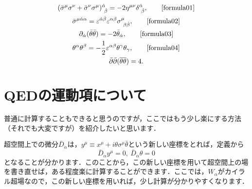 \documentclass[a4paper,uplatex,dvipdfmx]{jsarticle}
\theoremstyle{definition}
\begin{document}
\begin{gather}
  (
    \bar{\sigma}^{\mu}\sigma^{\nu}
    +
    \bar{\sigma}^{\nu}\sigma^{\mu}
  )^{\dot{\alpha}}_{\ \dot{\beta}}
  =
  -2\eta^{\mu\nu}\delta^{\dot{\alpha}}_{\ \dot{\beta}}
  ,
  \tag*{\eqref{formula01}}
  \\
  \bar{\sigma}^{\mu\dot{\alpha}\alpha}
  =
  \varepsilon^{\dot{\alpha}\dot{\beta}}\varepsilon^{\alpha\beta}
  \sigma^{\mu}_{\ \beta\dot{\beta}}
  ,
  \tag*{\eqref{formula02}}
  \\
  \partial_{\dot{\alpha}}(\bar{\theta}\bar{\theta})
  =
  -2\bar{\theta}_{\dot{\alpha}}   
  ,
  \tag*{\eqref{formula03}}
  \\
  \theta^{\alpha}\theta^{\beta}
  =
  -
  \frac{1}{2}\varepsilon^{\alpha\beta}\theta^{\gamma}\theta_{\gamma}
  ,
  \tag*{\eqref{formula04}}
  \\
  \bar{\partial}\bar{\partial}(\overline{\theta\theta})
  =
  4
  .
\end{gather}


\section{QEDの運動項について}
\label{kin_term_QED}

普通に計算することもできると思うのですが，ここではもう少し楽にする方法（それでも大変ですが）を紹介したいと思います．

超空間上での微分$\bar{D}_{\dot{\alpha}}$は，$y^{\mu}\equiv x^{\mu}+i\theta\sigma^{\mu}\bar{\theta}$という新しい座標をとれば，定義から
\begin{equation}
  \bar{D}_{\dot{\alpha}}y^{\mu}
  =
  0
  ,\ 
  \bar{D}_{\dot{\alpha}}\theta
  =
  0
\end{equation}
となることが分かります．このことから，この新しい座標を用いて超空間上の場を書き直せば，ある程度楽に計算することができます．ここでは，$W_{\alpha}$がカイラル超場なので，この新しい座標を用いれば，少し計算が分かりやすくなります．
\end{document}
